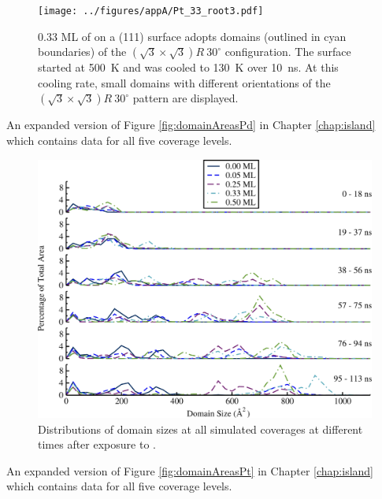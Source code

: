 \begin{figure}
  \centering
  \texttt{[image: ../figures/appA/Pt\_33\_root3.pdf]}
  \caption{0.33 ML of  on a (111) surface adopts domains
    (outlined in cyan boundaries) of the
    $(\sqrt{3} \times \sqrt{3}) R~30^{\circ}$ configuration. The
    surface started at 500~K and was cooled to 130~K over 10~ns.  At
    this cooling rate, small domains with different orientations of
    the $(\sqrt{3} \times \sqrt{3}) R~30^{\circ}$ pattern are
    displayed.}
\label{fig:Root3}
\end{figure}
\newpage



An expanded version of Figure \ref{fig:domainAreasPd} in Chapter \ref{chap:island} which contains data
for all five  coverage levels.

\begin{figure}
\centering
\includegraphics[width=\linewidth]{../figures/appA/domainSize_Pd_SI.pdf}
\caption{Distributions of  domain sizes at all simulated
 coverages at different times after exposure to .}
\label{fig:Pd_SI}
\end{figure}
\newpage




An expanded version of Figure \ref{fig:domainAreasPt} in Chapter \ref{chap:island} which contains data
for all five  coverage levels.

